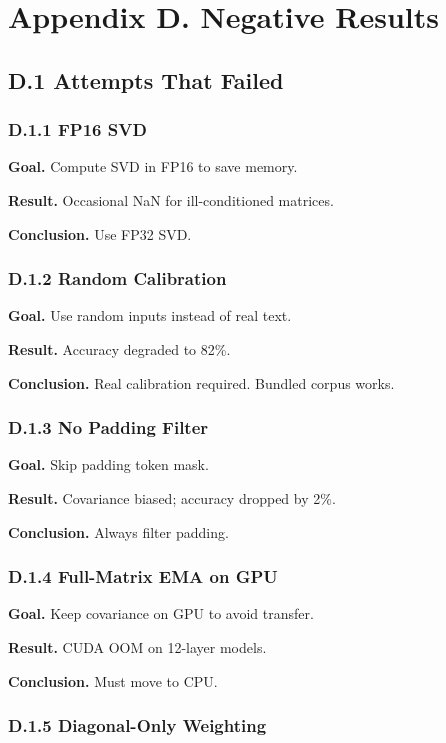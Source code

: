 
\section{Appendix D. Negative Results}

\subsection{D.1 Attempts That Failed}

\subsubsection{D.1.1 FP16 SVD}

\textbf{Goal.} Compute SVD in FP16 to save memory.

\textbf{Result.} Occasional NaN for ill-conditioned matrices.

\textbf{Conclusion.} Use FP32 SVD.

\subsubsection{D.1.2 Random Calibration}

\textbf{Goal.} Use random inputs instead of real text.

\textbf{Result.} Accuracy degraded to 82\%.

\textbf{Conclusion.} Real calibration required. Bundled corpus works.

\subsubsection{D.1.3 No Padding Filter}

\textbf{Goal.} Skip padding token mask.

\textbf{Result.} Covariance biased; accuracy dropped by 2\%.

\textbf{Conclusion.} Always filter padding.

\subsubsection{D.1.4 Full-Matrix EMA on GPU}

\textbf{Goal.} Keep covariance on GPU to avoid transfer.

\textbf{Result.} CUDA OOM on 12-layer models.

\textbf{Conclusion.} Must move to CPU.

\subsubsection{D.1.5 Diagonal-Only Weighting}

